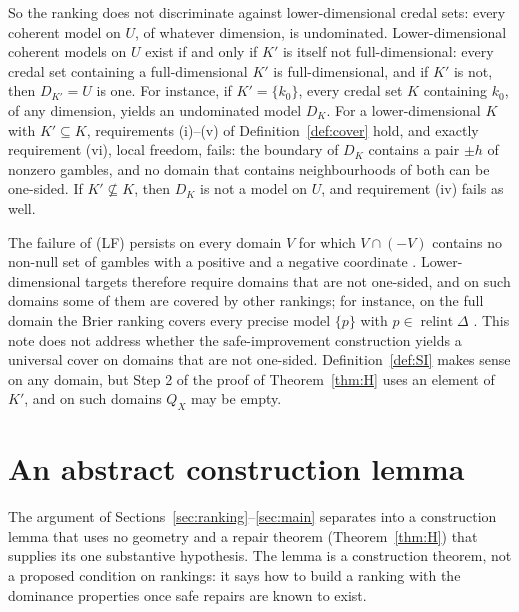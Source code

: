 \documentclass[11pt]{article}
\DeclareMathOperator{\relint}{relint}
\theoremstyle{plain}
\theoremstyle{definition}
\theoremstyle{remark}
\begin{document}
So the ranking does not discriminate against lower-dimensional credal sets: every
coherent model on $U$, of whatever dimension, is undominated. Lower-dimensional coherent
models on $U$ exist if and only if $K'$ is itself not full-dimensional: every credal set
containing a full-dimensional $K'$ is full-dimensional, and if $K'$ is not, then
$D_{K'}=U$ is one. For instance, if $K'=\{k_0\}$, every credal set $K$ containing $k_0$,
of any dimension, yields an undominated model $D_K$. For a lower-dimensional $K$ with
$K'\subseteq K$, requirements (i)--(v) of Definition~\ref{def:cover} hold, and exactly
requirement (vi), local freedom, fails: the boundary of $D_K$ contains a pair $\pm h$ of
nonzero gambles, and no domain that contains neighbourhoods of both can be one-sided. If
$K'\not\subseteq K$, then $D_K$ is not a model on $U$, and requirement (iv) fails as
well.

The failure of (LF) persists on every domain $V$ for which $V\cap(-V)$ contains no
non-null set of gambles with a positive and a negative coordinate
\cite[Prop.~2.10]{KCM}. Lower-dimensional targets therefore require domains that are not
one-sided, and on such domains some of them are covered by other rankings; for instance,
on the full domain the Brier ranking covers every precise model $\{p\}$ with
$p\in\relint\Delta$ \cite[Cor.~5.9]{KCM}. This note does not address whether the
safe-improvement construction yields a universal cover on domains that are not one-sided.
Definition~\ref{def:SI} makes sense on any domain, but Step 2 of the proof of
Theorem~\ref{thm:H} uses an element of $K'$, and on such domains $Q_X$ may be empty.

\section{An abstract construction lemma}\label{sec:abstract}

The argument of Sections~\ref{sec:ranking}--\ref{sec:main} separates into a construction
lemma that uses no geometry and a repair theorem (Theorem~\ref{thm:H}) that supplies its
one substantive hypothesis. The lemma is a construction theorem, not a proposed condition
on rankings: it says how to build a ranking with the dominance properties once safe repairs
are known to exist.
\end{document}
